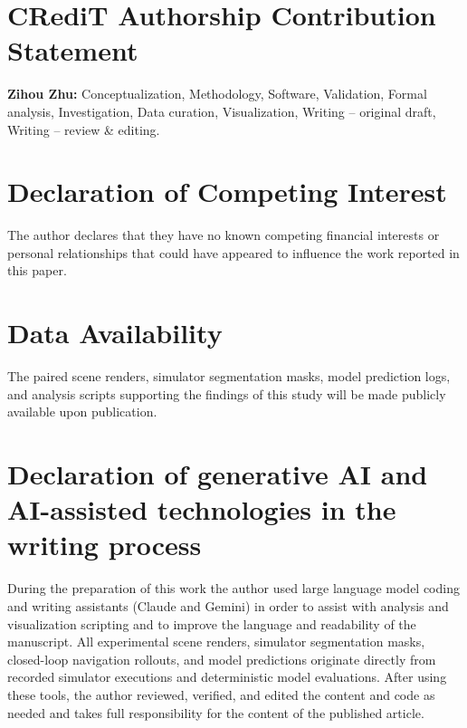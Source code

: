 \section*{CRediT Authorship Contribution Statement}
\textbf{Zihou Zhu:} Conceptualization, Methodology, Software, Validation, Formal analysis, Investigation, Data curation, Visualization, Writing -- original draft, Writing -- review \& editing.

\section*{Declaration of Competing Interest}
The author declares that they have no known competing financial interests or personal relationships that could have appeared to influence the work reported in this paper.

\section*{Data Availability}
The paired scene renders, simulator segmentation masks, model prediction logs, and analysis scripts supporting the findings of this study will be made publicly available upon publication.

\section*{Declaration of generative AI and AI-assisted technologies in the writing process}
During the preparation of this work the author used large language model coding and writing assistants (Claude and Gemini) in order to assist with analysis and visualization scripting and to improve the language and readability of the manuscript. All experimental scene renders, simulator segmentation masks, closed-loop navigation rollouts, and model predictions originate directly from recorded simulator executions and deterministic model evaluations. After using these tools, the author reviewed, verified, and edited the content and code as needed and takes full responsibility for the content of the published article.
